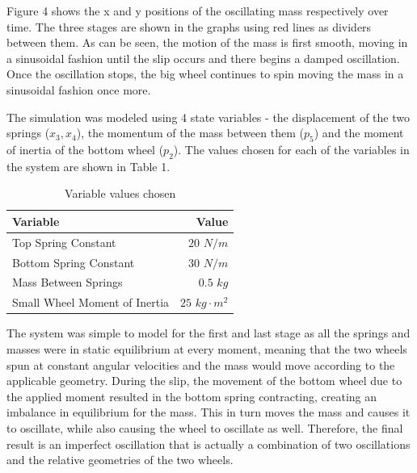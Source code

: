 \documentclass[twoside,twocolumn]{article}
\begin{document}
Figure 4 shows the x and y positions of the oscillating mass respectively over time. The three stages are shown in the graphs using red lines as dividers between them. As can be seen, the motion of the mass is first smooth, moving in a sinusoidal fashion until the slip occurs and there begins a damped oscillation. Once the oscillation stops, the big wheel continues to spin moving the mass in a sinusoidal fashion once more.

The simulation was modeled using 4 state variables - the displacement of the two springs ($x_3, x_4$), the momentum of the mass between them ($p_5$) and the moment of inertia of the bottom wheel ($p_2$). The values chosen for each of the variables in the system are shown in Table 1.

\begin{table}
\caption{Variable values chosen}
\centering
\begin{tabular}{lr}
\toprule
\cmidrule(r){1-2}
Variable & Value \\
\midrule
Top Spring Constant & $20$ $N/m$ \\
Bottom Spring Constant & $30$ $N/m$ \\
Mass Between Springs & $0.5$ $kg$ \\
Small Wheel Moment of Inertia & $25$ $kg \cdot m^2$ \\
\bottomrule
\end{tabular}
\end{table}

The system was simple to model for the first and last stage as all the springs and masses were in static equilibrium at every moment, meaning that the two wheels spun at constant angular velocities and the mass would move according to the applicable geometry. During the slip, the movement of the bottom wheel due to the applied moment resulted in the bottom spring contracting, creating an imbalance in equilibrium for the mass. This in turn moves the mass and causes it to oscillate, while also causing the wheel to oscillate as well. Therefore, the final result is an imperfect oscillation that is actually a combination of two oscillations and the relative geometries of the two wheels.


\end{document}
